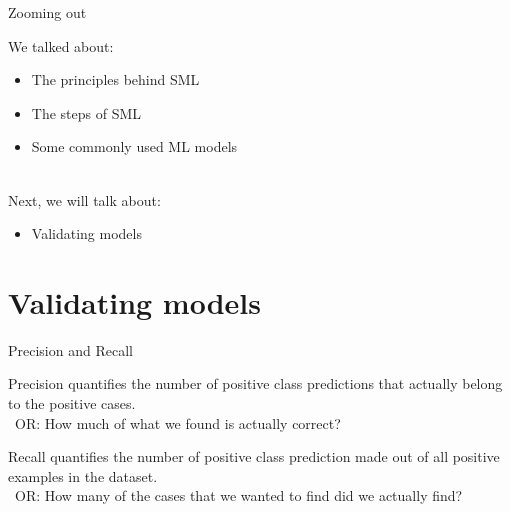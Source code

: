 \documentclass[handout]{beamer}
\begin{document}
\begin{frame}{Zooming out} 
	
	We talked about:
	\begin{itemize}
		\item The principles behind SML
		\item The steps of SML
		\item Some commonly used ML models \\\
	\end{itemize}
	
	Next, we will talk about:
	\begin{itemize}
		\item Validating models
	\end{itemize}
	
\end{frame}


\section{Validating models}


\begin{frame}{Precision and Recall}
	
	Precision quantifies the number of positive class predictions that actually belong to the positive cases. \\\ 
	OR: How much of what we found is actually correct?
	
	Recall quantifies the number of positive class prediction made out of all positive examples in the dataset. \\\
	OR: How many of the cases that we wanted to find did we actually find?




\end{frame}
	
\end{document}
